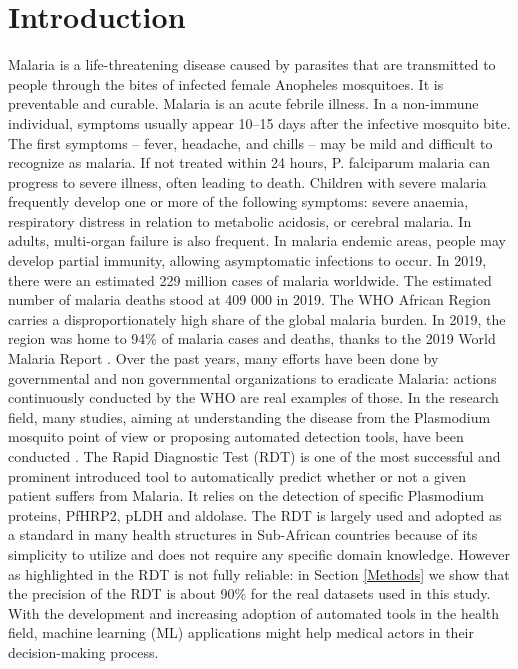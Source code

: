 \section{Introduction}\label{Introduction}
Malaria is a life-threatening disease caused by parasites that are transmitted to people through the bites of infected female Anopheles mosquitoes. It is preventable and curable. Malaria is an acute febrile illness. In a non-immune individual, symptoms usually appear 10–15 days after the infective mosquito bite. The first symptoms – fever, headache, and chills – may be mild and difficult to recognize as malaria. If not treated within 24 hours, P. falciparum malaria can progress to severe illness, often leading to death. Children with severe malaria frequently develop one or more of the following symptoms: severe anaemia, respiratory distress in relation to metabolic acidosis, or cerebral malaria. In adults, multi-organ failure is also frequent. In malaria endemic areas, people may develop partial immunity, allowing asymptomatic infections to occur. In 2019, there were an estimated 229 million cases of malaria worldwide. The estimated number of malaria deaths stood at 409 000 in 2019. The WHO African Region carries a disproportionately high share of the global malaria burden. In 2019, the region was home to 94\% of malaria cases and deaths, thanks to the  2019 World Malaria Report \cite{19WMR}. 
Over the past years, many efforts have been done by governmental and non governmental organizations  to eradicate Malaria:  actions continuously conducted by the WHO are real examples of those.  In the research field, many studies, aiming at understanding the disease from the Plasmodium mosquito point of view or proposing automated detection tools, have been conducted \cite{Ga19,Le74,ermert2011development,Hu17}. The Rapid Diagnostic Test (RDT) \cite{Hu17} is one of the most successful and prominent introduced tool to automatically predict whether or not a given patient suffers from Malaria. It relies on the
detection of specific Plasmodium proteins, PfHRP2, pLDH
and aldolase. The RDT is largely used and adopted as a standard in many health structures in Sub-African countries because of its simplicity to utilize and does not require any specific domain knowledge. However as highlighted in \cite{Hu17} the RDT is not fully reliable:  in Section \ref{Methods} we show that the precision of the RDT is about 90\% for the real datasets used in this study.
With the development and increasing adoption of automated tools in the health field, machine learning  (ML) \cite{mitchell1997machine, Ug1} applications might help medical actors in their decision-making process. 
